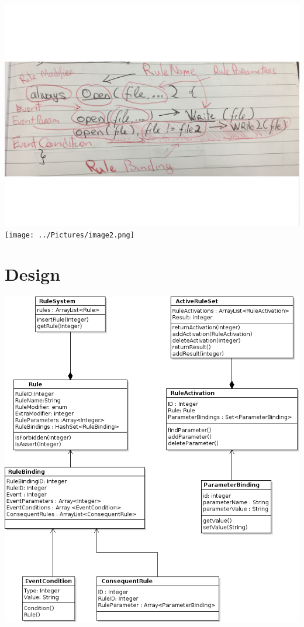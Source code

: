 \documentclass[a4paper]{article}
\begin{document}
\includegraphics[width=\textwidth,height=\textheight,keepaspectratio]{../Pictures/image1.png}
\texttt{[image: ../Pictures/image2.png]}

\newpage

\section{Design}
\includegraphics[width=\textwidth,height=\textheight,keepaspectratio]{../Graphs/classes.png}
\end{document}
